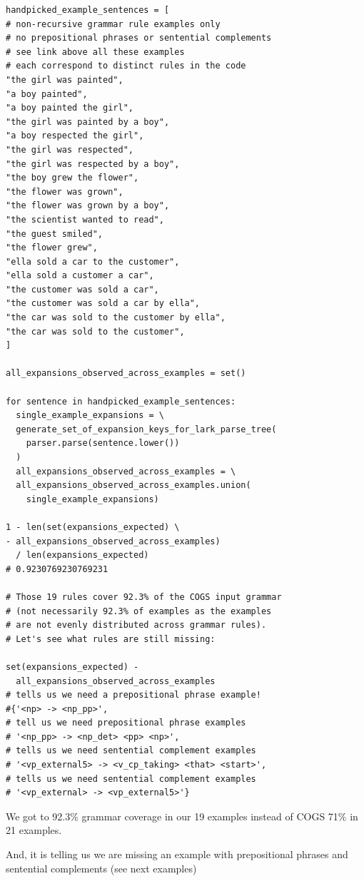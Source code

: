 \documentclass[11pt]{article}
\begin{document}
\begin{tiny}
\begin{verbatim}
handpicked_example_sentences = [ 
# non-recursive grammar rule examples only
# no prepositional phrases or sentential complements
# see link above all these examples 
# each correspond to distinct rules in the code
"the girl was painted",
"a boy painted",
"a boy painted the girl",
"the girl was painted by a boy",
"a boy respected the girl", 
"the girl was respected",
"the girl was respected by a boy",
"the boy grew the flower",
"the flower was grown",
"the flower was grown by a boy",
"the scientist wanted to read",
"the guest smiled",
"the flower grew",
"ella sold a car to the customer",
"ella sold a customer a car",
"the customer was sold a car",
"the customer was sold a car by ella",
"the car was sold to the customer by ella",
"the car was sold to the customer",
]

all_expansions_observed_across_examples = set()

for sentence in handpicked_example_sentences:
  single_example_expansions = \
  generate_set_of_expansion_keys_for_lark_parse_tree(
    parser.parse(sentence.lower())
  )
  all_expansions_observed_across_examples = \
  all_expansions_observed_across_examples.union(
    single_example_expansions)

1 - len(set(expansions_expected) \
- all_expansions_observed_across_examples) 
  / len(expansions_expected)
# 0.9230769230769231

# Those 19 rules cover 92.3% of the COGS input grammar
# (not necessarily 92.3% of examples as the examples 
# are not evenly distributed across grammar rules).
# Let's see what rules are still missing:

set(expansions_expected) - 
  all_expansions_observed_across_examples
# tells us we need a prepositional phrase example!
#{'<np> -> <np_pp>',
# tell us we need prepositional phrase examples
# '<np_pp> -> <np_det> <pp> <np>',
# tells us we need sentential complement examples
# '<vp_external5> -> <v_cp_taking> <that> <start>',
# tells us we need sentential complement examples
# '<vp_external> -> <vp_external5>'}
\end{verbatim}
\end{tiny}

\clearpage
We got to 92.3\% grammar coverage in our 19 examples instead of COGS 71\% in 21 examples.

And, it is telling us we are missing an example with prepositional phrases and sentential complements (see next examples)
\end{document}
